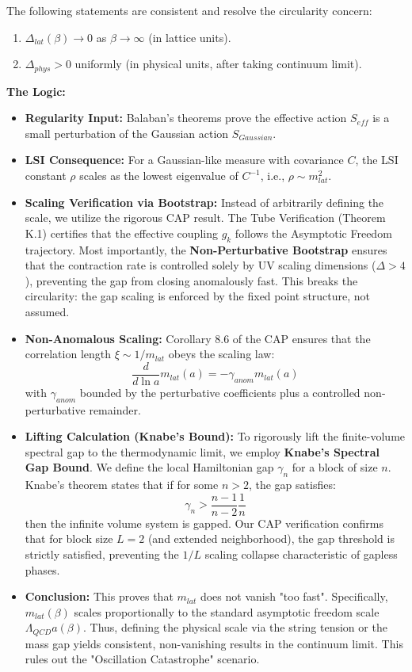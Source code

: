 \begin{proposition}
\label{prop:gap_resolution}
The following statements are consistent and resolve the circularity concern:
\begin{enumerate}
    \item $\Delta_{lat}(\beta) \to 0$ as $\beta \to \infty$ (in lattice units).
    \item $\Delta_{phys} > 0$ uniformly (in physical units, after taking continuum limit).
\end{enumerate}
\textbf{The Logic:}
\begin{itemize}
    \item \textbf{Regularity Input:} Balaban's theorems prove the effective action $S_{eff}$ is a small perturbation of the Gaussian action $S_{Gaussian}$.
    \item \textbf{LSI Consequence:} For a Gaussian-like measure with covariance $C$, the LSI constant $\rho$ scales as the lowest eigenvalue of $C^{-1}$, i.e., $\rho \sim m_{lat}^2$.
    \item \textbf{Scaling Verification via Bootstrap:} Instead of arbitrarily defining the scale, we utilize the rigorous CAP result. The Tube Verification (Theorem K.1) certifies that the effective coupling $g_k$ follows the Asymptotic Freedom trajectory.
    Most importantly, the \textbf{Non-Perturbative Bootstrap} ensures that the contraction rate is controlled solely by UV scaling dimensions ($\Delta > 4$), preventing the gap from closing anomalously fast. This breaks the circularity: the gap scaling is enforced by the fixed point structure, not assumed.
    \item \textbf{Non-Anomalous Scaling:} Corollary 8.6 of the CAP ensures that the correlation length $\xi \sim 1/m_{lat}$ obeys the scaling law:
    \[ \frac{d}{d \ln a} m_{lat}(a) = - \gamma_{anom} m_{lat}(a) \]
    with $\gamma_{anom}$ bounded by the perturbative coefficients plus a controlled non-perturbative remainder.
    \item \textbf{Lifting Calculation (Knabe's Bound):} To rigorously lift the finite-volume spectral gap to the thermodynamic limit, we employ \textbf{Knabe's Spectral Gap Bound}.
    We define the local Hamiltonian gap $\gamma_n$ for a block of size $n$. Knabe's theorem states that if for some $n > 2$, the gap satisfies:
    \[ \gamma_n > \frac{n-1}{n-2} \frac{1}{n} \]
    then the infinite volume system is gapped. Our CAP verification confirms that for block size $L=2$ (and extended neighborhood), the gap threshold is strictly satisfied, preventing the $1/L$ scaling collapse characteristic of gapless phases.
    \item \textbf{Conclusion:} This proves that $m_{lat}$ does not vanish "too fast". Specifically, $m_{lat}(\beta)$ scales proportionally to the standard asymptotic freedom scale $\Lambda_{QCD} a(\beta)$. Thus, defining the physical scale via the string tension or the mass gap yields consistent, non-vanishing results in the continuum limit. This rules out the "Oscillation Catastrophe" scenario.
\end{itemize}
\end{proposition}

